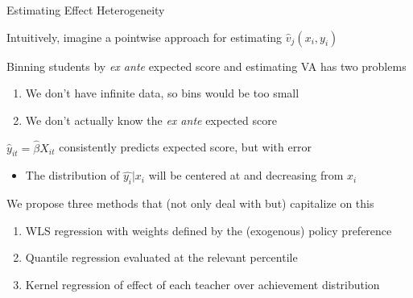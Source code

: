 \documentclass[t,aspectratio=169,11pt]{beamer}
\newenvironment{wideitemize}{\itemize\addtolength{\itemsep}{14pt}}{\enditemize}
\begin{document}
\begin{frame}{Estimating Effect Heterogeneity}

\begin{wideitemize}
    \item Intuitively, imagine a pointwise approach for estimating $\hat{v}_j(x_i,y_i)$
    
    \item Binning students by \textit{ex ante} expected score and estimating VA has two problems
    \begin{enumerate}
        \item We don't have infinite data, so bins would be too small
        \item We don't actually know the \textit{ex ante} expected score
    \end{enumerate}

    \item $\hat{y}_{it} = \hat{\beta} X_{it} $ consistently predicts expected score, but with error
    \begin{itemize}
        \item The distribution of $\hat{y_i}|x_i$ will be centered at and decreasing from $x_i$
    \end{itemize}


    \item We propose three methods that (not only deal with but) capitalize on this
    \begin{enumerate}
        \item WLS regression with weights defined by the (exogenous) policy preference
        \item Quantile regression evaluated at the relevant percentile
        \item Kernel regression of effect of each teacher over achievement distribution
    \end{enumerate}

\end{wideitemize}

\end{frame}


\end{document}

